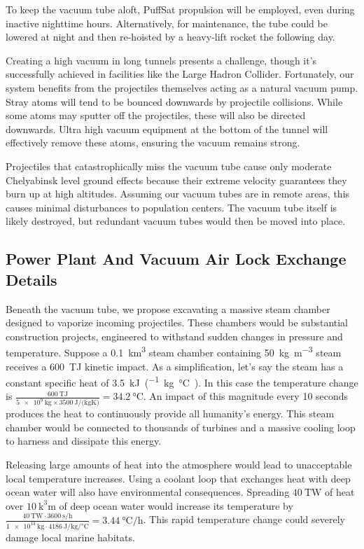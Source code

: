 \documentclass{article}
\begin{document}
To keep the vacuum tube aloft, PuffSat propulsion will be employed, even during inactive nighttime hours. Alternatively, for maintenance, the tube could be lowered at night and then re-hoisted by a heavy-lift rocket the following day.

Creating a high vacuum in long tunnels presents a challenge, though it's successfully achieved in facilities like the Large Hadron Collider. Fortunately, our system benefits from the projectiles themselves acting as a natural vacuum pump. Stray atoms will tend to be bounced downwards by  projectile collisions. While some atoms may sputter off the projectiles, these will also be directed downwards. Ultra high vacuum equipment at the bottom of the tunnel will effectively remove these atoms, ensuring the vacuum remains strong.

Projectiles that catastrophically miss the vacuum tube cause only moderate Chelyabinsk level \cite{popova2021chelyabinsk} ground effects because their extreme velocity guarantees they burn up at high altitudes.   Assuming our vacuum tubes are in remote areas, this causes minimal disturbances to population centers.   The vacuum tube itself is likely destroyed, but redundant vacuum tubes would then be moved into place.

\subsection{Power Plant And Vacuum Air Lock Exchange Details}
Beneath the vacuum tube, we propose excavating a massive steam chamber designed to vaporize incoming projectiles. These chambers would be substantial construction projects, engineered to withstand sudden changes in pressure and temperature.  Suppose a \SI{0.1}{\cubic\kilo\meter} steam chamber containing \SI{50}{\kilo\gram\per\cubic\meter} steam receives a \SI{600}{\tera\joule} kinetic impact.   As a simplification, let's say the steam has a constant specific heat of \SI{3.5}{\kilo\joule\per(\kilo\gram\celsius)}.  In this case the temperature change is 
$\frac{\SI{600}{\tera\joule}}{\SI{5e9}{\kilo\gram}\times\SI{3500}{\joule\per(\kilo\gram\kelvin)}} = \SI{34.2}{\celsius}$.  An impact of this magnitude every 10 seconds produces the heat to continuously provide all humanity's energy.  This steam chamber would be connected to thousands of turbines and a massive cooling loop to harness and dissipate this energy.  

Releasing large amounts of heat into the atmosphere would lead to unacceptable local temperature increases. Using a coolant loop that exchanges heat with deep ocean water will also have environmental consequences. Spreading $\SI{40}{\tera\watt}$ of heat over $\SI{10}{\cubic\kilo\meter}$ of deep ocean water would increase its temperature by $\frac{\SI{40}{\tera\watt}\cdot\SI{3600}{\second\per\hour}}{\SI{1e13}{\kilo\gram}\cdot\SI{4186}{\joule\per\kilo\gram\per\celsius}} = \SI{3.44}{\celsius\per\hour}$.  This rapid temperature change could severely damage local marine habitats.
\end{document}
